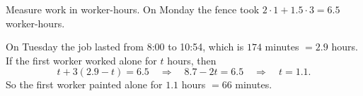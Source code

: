 Measure work in worker-hours. On Monday the fence took $2\cdot1+1.5\cdot3=6.5$ worker-hours.

On Tuesday the job lasted from 8:00 to 10:54, which is $174$ minutes $=2.9$ hours. If the first worker worked alone for $t$ hours, then
\[
t+3(2.9-t)=6.5\quad\Longrightarrow\quad 8.7-2t=6.5\quad\Longrightarrow\quad t=1.1 .
\]
So the first worker painted alone for $1.1$ hours $=\boxed{66}$ minutes.
